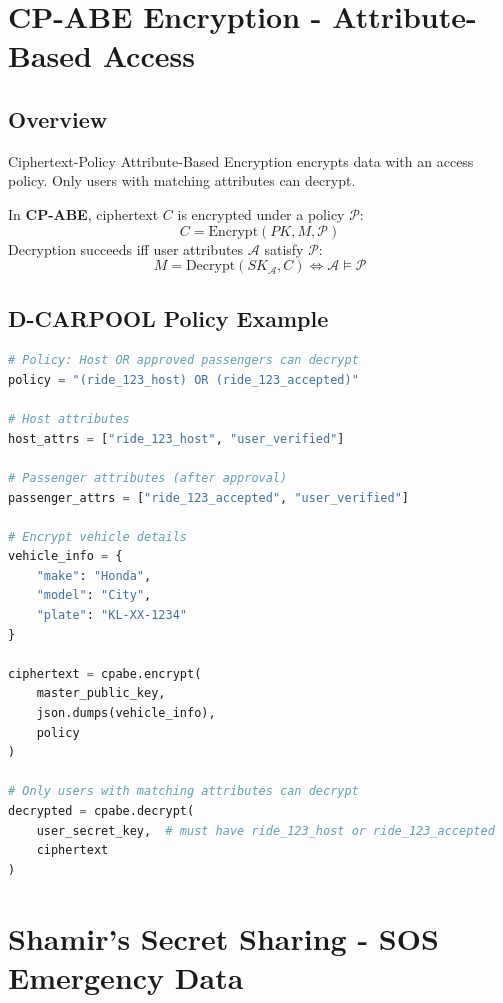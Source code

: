 \section{CP-ABE Encryption - Attribute-Based Access}

\subsection{Overview}

Ciphertext-Policy Attribute-Based Encryption encrypts data with an access policy. Only users with matching attributes can decrypt.

\begin{definition}
In \textbf{CP-ABE}, ciphertext $C$ is encrypted under a policy $\mathcal{P}$:
\begin{equation}
C = \text{Encrypt}(PK, M, \mathcal{P})
\end{equation}
Decryption succeeds iff user attributes $\mathcal{A}$ satisfy $\mathcal{P}$:
\begin{equation}
M = \text{Decrypt}(SK_{\mathcal{A}}, C) \iff \mathcal{A} \models \mathcal{P}
\end{equation}
\end{definition}

\subsection{D-CARPOOL Policy Example}

\begin{lstlisting}[language=Python, caption=CP-ABE Policy for Vehicle Info]
# Policy: Host OR approved passengers can decrypt
policy = "(ride_123_host) OR (ride_123_accepted)"

# Host attributes
host_attrs = ["ride_123_host", "user_verified"]

# Passenger attributes (after approval)
passenger_attrs = ["ride_123_accepted", "user_verified"]

# Encrypt vehicle details
vehicle_info = {
    "make": "Honda",
    "model": "City",
    "plate": "KL-XX-1234"
}

ciphertext = cpabe.encrypt(
    master_public_key,
    json.dumps(vehicle_info),
    policy
)

# Only users with matching attributes can decrypt
decrypted = cpabe.decrypt(
    user_secret_key,  # must have ride_123_host or ride_123_accepted
    ciphertext
)
\end{lstlisting}

\section{Shamir's Secret Sharing - SOS Emergency Data}

